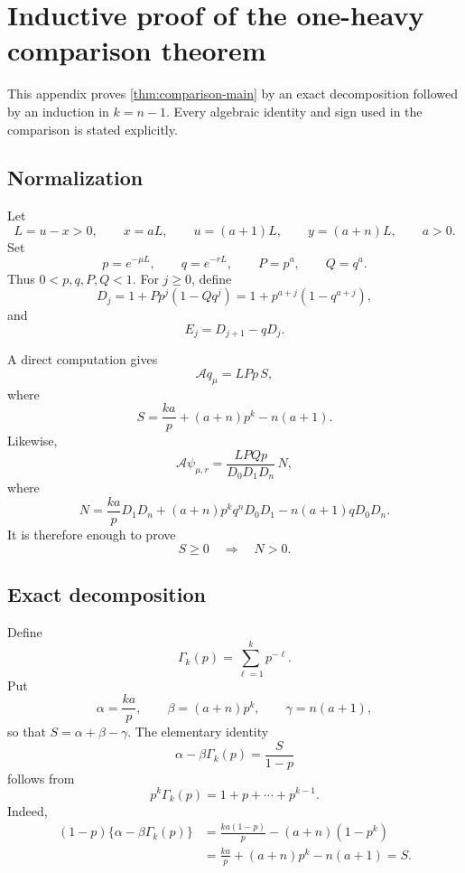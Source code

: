 \documentclass[11pt]{article}
\theoremstyle{plain}
\theoremstyle{definition}
\theoremstyle{remark}
\newcommand{\cA}{\mathcal A}
\begin{document}
\appendix

\section{Inductive proof of the one-heavy comparison theorem}\label{app:comparison}

This appendix proves \cref{thm:comparison-main} by an exact decomposition followed by an induction in \(k=n-1\).  Every algebraic identity and sign used in the comparison is stated explicitly.

\subsection{Normalization}

Let
\[
L=u-x>0,
\qquad
x=aL,
\qquad
u=(a+1)L,
\qquad
y=(a+n)L,
\qquad a>0.
\]
Set
\[
p=e^{-\mu L},
\qquad
q=e^{-rL},
\qquad
P=p^a,
\qquad
Q=q^a.
\]
Thus \(0<p,q,P,Q<1\).  For \(j\ge0\), define
\begin{equation}\label{eq:Dj-app}
D_j=1+Pp^j(1-Qq^j)
=1+p^{a+j}(1-q^{a+j}),
\end{equation}
and
\begin{equation}\label{eq:Ej-app}
E_j=D_{j+1}-qD_j.
\end{equation}

A direct computation gives
\begin{equation}\label{eq:Aq-S-app}
\cA q_\mu=LPp\,S,
\end{equation}
where
\begin{equation}\label{eq:S-app}
S=\frac{ka}{p}+(a+n)p^k-n(a+1).
\end{equation}
Likewise,
\begin{equation}\label{eq:Apsi-N-app}
\cA\psi_{\mu,r}
=\frac{LPQp}{D_0D_1D_n}\,N,
\end{equation}
where
\begin{equation}\label{eq:N-app}
N=\frac{ka}{p}D_1D_n
+(a+n)p^kq^nD_0D_1
-n(a+1)qD_0D_n.
\end{equation}
It is therefore enough to prove
\[
S\ge0\quad\Longrightarrow\quad N>0.
\]

\subsection{Exact decomposition}

Define
\begin{equation}\label{eq:Gamma-app}
\Gamma_k(p)=\sum_{\ell=1}^k p^{-\ell}.
\end{equation}
Put
\[
\alpha=\frac{ka}{p},
\qquad
\beta=(a+n)p^k,
\qquad
\gamma=n(a+1),
\]
so that \(S=\alpha+\beta-\gamma\).  The elementary identity
\begin{equation}\label{eq:key-alpha-beta-app}
\alpha-\beta\Gamma_k(p)=\frac{S}{1-p}
\end{equation}
follows from
\[
p^k\Gamma_k(p)=1+p+\cdots+p^{k-1}.
\]
Indeed,
\begin{align*}
(1-p)\{\alpha-\beta\Gamma_k(p)\}
&=\frac{ka(1-p)}p-(a+n)(1-p^k)\\
&=\frac{ka}{p}+(a+n)p^k-n(a+1)=S.
\end{align*}
\end{document}
